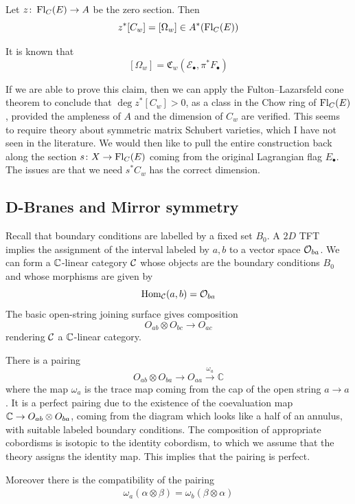 \documentclass[12pt]{article}
\begin{document}
\begin{claim} Let $z\colon \operatorname{Fl}_C(E)\to A$ be the zero section. Then
    \[z^*[C_w]=[\Omega_w] \in A^*(\operatorname{Fl}_C(E))\]
\end{claim}
It is known that
\[[\Omega_w]
=
\mathfrak C_w(\mathcal E_\bullet,\pi^*F_\bullet)\]


If we are able to prove this claim, then we can apply the Fulton--Lazarsfeld cone theorem to conclude that $\deg z^*[C_w]>0$, as a class in the Chow ring of $\operatorname{Fl}_C(E)$, provided the ampleness of $A$ and the dimension of $C_w$ are verified. This seems to require theory about symmetric matrix Schubert varieties, which I have not seen in the literature.
 We would then like to pull the entire construction back along the section $s\colon X\to \operatorname{Fl}_C(E)$ coming from the original Lagrangian flag $E_\bullet$. The issues are that we need $s^*C_w$ has the correct dimension. 


\subsection{D-Branes and Mirror symmetry}
Recall that boundary conditions are labelled by a fixed set $B_0$. A $2D$ TFT implies the assignment of the interval labeled by $a,b$ to a vector space ${\mathcal{O}}_{ba}$. We can form a $\mathbb{C}$-linear category ${\mathcal{C}}$ whose objects are the boundary conditions $B_0$ and whose morphisms are given by
\[\operatorname{Hom}_{\mathcal{C}}(a,b)={\mathcal{O}}_{ba}
\]
The basic open-string joining surface gives composition
\[O_{ab}\otimes O_{bc}\to O_{ac}\] rendering ${\mathcal{C}}$ a $\mathbb{C}$-linear category. 

There is a pairing \[
O_{ab}\otimes O_{ba}
\longrightarrow
O_{aa}
\xrightarrow{\omega_a}
\mathbb C\]
where the map $\omega_a$ is the trace map coming from the cap of the open string $a\to a$. It is a perfect pairing due to the existence of the coevaluation map $\mathbb{C} \to O_{ab}\otimes O_{ba}$, coming from the diagram which looks like a half of an annulus, with suitable labeled boundary conditions. The composition of appropriate cobordisms is isotopic to the identity cobordism, to which we assume that the theory assigns the identity map. This implies that the pairing is perfect.

Moreover there is the compatibility of the pairing \begin{align*}
    \omega_a(\alpha\otimes \beta) = \omega_b(\beta\otimes \alpha)
\end{align*}
\end{document}
